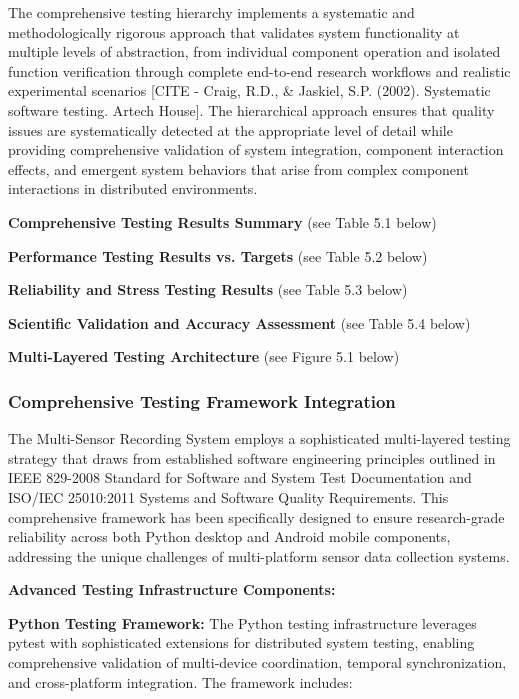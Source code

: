 \documentclass[12pt,a4paper]{article}
\begin{document}
The comprehensive testing hierarchy implements a systematic and methodologically rigorous approach that validates system
functionality at multiple levels of abstraction, from individual component operation and isolated function verification
through complete end-to-end research workflows and realistic experimental
scenarios [CITE - Craig, R.D., \& Jaskiel, S.P. (2002). Systematic software testing. Artech House]. The hierarchical
approach ensures that quality issues are systematically detected at the appropriate level of detail while providing
comprehensive validation of system integration, component interaction effects, and emergent system behaviors that arise
from complex component interactions in distributed environments.

\textbf{Comprehensive Testing Results Summary} (see Table 5.1 below)

\textbf{Performance Testing Results vs. Targets} (see Table 5.2 below)

\textbf{Reliability and Stress Testing Results} (see Table 5.3 below)

\textbf{Scientific Validation and Accuracy Assessment} (see Table 5.4 below)

\textbf{Multi-Layered Testing Architecture} (see Figure 5.1 below)

\subsubsection{Comprehensive Testing Framework Integration}

The Multi-Sensor Recording System employs a sophisticated multi-layered testing strategy that draws from established
software engineering principles outlined in IEEE 829-2008 Standard for Software and System Test Documentation and
ISO/IEC 25010:2011 Systems and Software Quality Requirements. This comprehensive framework has been specifically
designed to ensure research-grade reliability across both Python desktop and Android mobile components, addressing the
unique challenges of multi-platform sensor data collection systems.

\textbf{Advanced Testing Infrastructure Components:}

\textbf{Python Testing Framework:}
The Python testing infrastructure leverages pytest with sophisticated extensions for distributed system testing,
enabling comprehensive validation of multi-device coordination, temporal synchronization, and cross-platform
integration. The framework includes:
\end{document}
